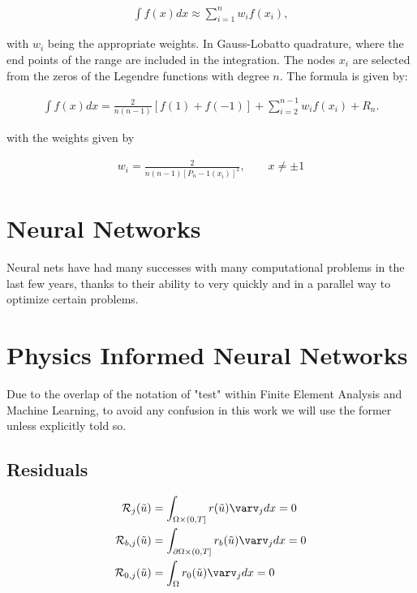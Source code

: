 \begin{align}
  \int f(x)dx \approx \sum_{i=1}^{n} w_i f(x_i),
\end{align}

with $w_i$ being the appropriate weights. In Gauss-Lobatto quadrature, where the end points of the range are included in the integration. The nodes $x_i$ are selected from the zeros of the Legendre functions with degree $n$. The formula is given by:

\begin{align}
  \int f(x)dx = \frac{2}{n(n-1)}[f(1) + f(-1)] + \sum_{i=2}^{n-1} w_i f(x_i) + R_n.
\end{align}

with the weights given by

\begin{align}
  w_i = \frac{2}{n(n-1)[P_n-1 (x_i)]^2}, \qquad x \neq \pm 1
\end{align}

\section{Neural Networks}
Neural nets have had many successes with many computational problems in the last few years,
thanks to their ability to very quickly and in a parallel way to optimize certain problems. ~\cite{Example}

\begin{figure}[!ht]
  \centering
  
\end{figure}



\section{Physics Informed Neural Networks}

Due to the overlap of the notation of "test" within Finite Element Analysis and Machine Learning,
to avoid any confusion in this work we will use the former unless explicitly told so.

\subsection{Residuals}

\begin{align}
  \mathcal{R}_{j}(\tilde{u}) &=  \int_{\Omega \times (0, T] } r(\tilde{u}) \varv_j dx = 0 \\
  \mathcal{R}_{b,j}(\tilde{u}) &=  \int_{\partial\Omega \times (0, T] } r_b(\tilde{u}) \varv_j dx = 0 \\
  \mathcal{R}_{0,j}(\tilde{u}) &=  \int_\Omega r_0(\tilde{u}) \varv_j dx = 0
\end{align}

